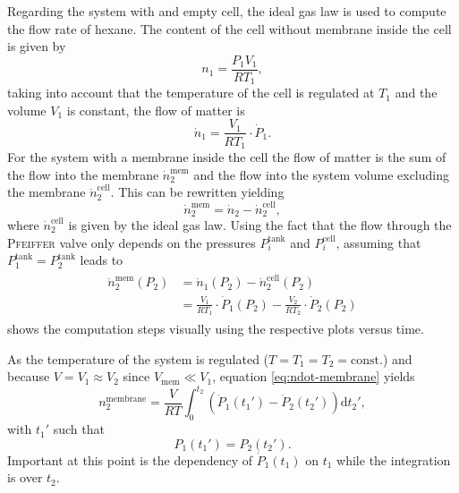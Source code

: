 \documentclass[../thesis.tex]{subfiles}
\begin{document}
      Regarding the system with and empty cell, the ideal gas law is used to compute the flow rate of hexane. The content of the cell without membrane inside the cell is given by
      \begin{equation*}
          n_1 = \frac{P_1V_1}{RT_1},
      \end{equation*}
      taking into account that the temperature of the cell is regulated at $T_1$ and the volume $V_1$ is constant, the flow of matter is
      \begin{equation*}
          \dot{n}_1 = \frac{V_1}{RT_1}\cdot \dot{P}_1.
          \label{eq:n1}
      \end{equation*}
      For the system with a membrane inside the cell the flow of matter is the sum of the flow into the membrane $\dot{n}_2^\mathrm{mem}$ and the flow into the system volume excluding the membrane $\dot{n}_2^\mathrm{cell}$. This can be rewritten yielding
      \begin{equation*}
          \dot{n}_2^\mathrm{mem} = \dot{n}_2 - \dot{n}_2^\mathrm{cell},
      \end{equation*}
      where $\dot{n}^\mathrm{cell}_2$ is given by the ideal gas law. Using the fact that the flow through the \textsc{Pfeiffer} valve only depends on the pressures $P_i^\mathrm{tank}$ and $P_i^\mathrm{cell}$, assuming that $P_1^\mathrm{tank} = P_2^\mathrm{tank}$ leads to
      \begin{align}
          \begin{split}
              \dot{n}_2^\mathrm{mem}(P_2) &= \dot{n}_1(P_2) - \dot{n}_2^\mathrm{cell}(P_2)\\
              &=\frac{V_1}{RT_1}\cdot \dot{P}_1(P_2) - \frac{V_2}{RT_2}\cdot \dot{P}_2(P_2)
          \end{split}
          \label{eq:ndot-membrane}
      \end{align}
       shows the computation steps visually using the respective plots versus time.

      

      As the temperature of the system is regulated ($T = T_1 = T_2 = \mathrm{const.}$) and because $V = V_1 \approx V_2$ since $V_\mathrm{mem} \ll V_1$, equation \cref{eq:ndot-membrane} yields
      \begin{equation*}
          n_2^\mathrm{membrane} = \frac{V}{RT}\int_0^{t_2}\left(\dot{P}_1(t_1') - \dot{P}_2(t_2')\right) \mathrm{d}t_2',
          \label{eq:nmembrane-1}
      \end{equation*}
      with $t_1'$ such that
      \begin{equation*}
        P_1(t_1')=P_2(t_2').
      \end{equation*}
      Important at this point is the dependency of $\dot{P}_1(t_1)$ on $t_1$ while the integration is over $t_2$.
\end{document}
